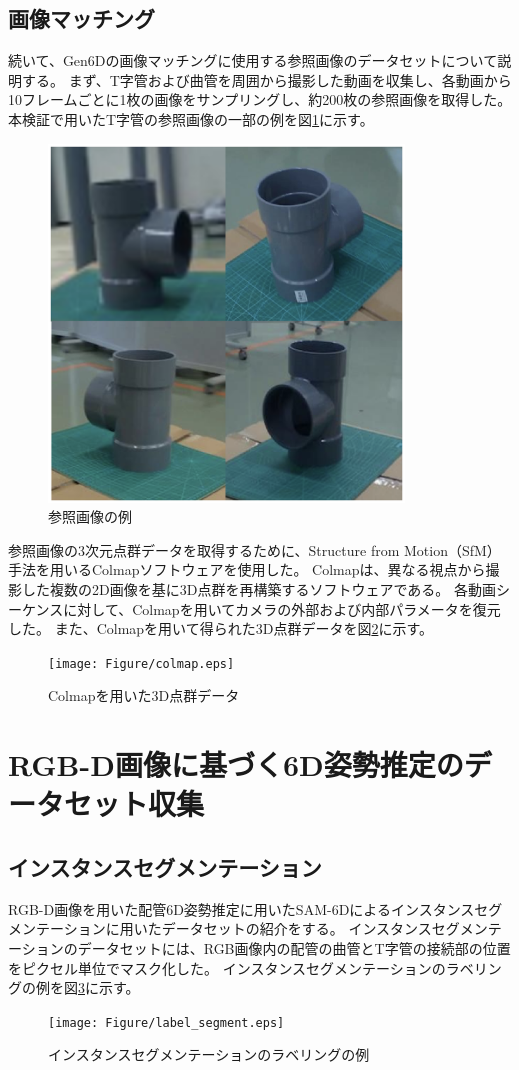 \subsection{画像マッチング}
続いて、Gen6Dの画像マッチングに使用する参照画像のデータセットについて説明する。
まず、T字管および曲管を周囲から撮影した動画を収集し、各動画から10フレームごとに1枚の画像をサンプリングし、約200枚の参照画像を取得した。
本検証で用いたT字管の参照画像の一部の例を図\ref{fig:f2}に示す。
\begin{figure}[htbt]
  \centering
   \includegraphics[height=95mm]{Figure/ref_images.eps}
   \caption{参照画像の例}
   \label{fig:f2}
\end{figure}

参照画像の3次元点群データを取得するために、Structure from Motion（SfM）手法を用いるColmapソフトウェアを使用した。
Colmapは、異なる視点から撮影した複数の2D画像を基に3D点群を再構築するソフトウェアである。
各動画シーケンスに対して、Colmapを用いてカメラの外部および内部パラメータを復元した。
また、Colmapを用いて得られた3D点群データを図\ref{fig:f3}に示す。
\begin{figure}[htbt]
  \centering
   \texttt{[image: Figure/colmap.eps]}
   \caption{Colmapを用いた3D点群データ}
   \label{fig:f3}
\end{figure}


\section{RGB-D画像に基づく6D姿勢推定のデータセット収集}
\subsection{インスタンスセグメンテーション}
RGB-D画像を用いた配管6D姿勢推定に用いたSAM-6Dによるインスタンスセグメンテーションに用いたデータセットの紹介をする。
インスタンスセグメンテーションのデータセットには、RGB画像内の配管の曲管とT字管の接続部の位置をピクセル単位でマスク化した。
インスタンスセグメンテーションのラベリングの例を図\ref{fig:f4}に示す。
\begin{figure}[htbt]
	\centering
	 \texttt{[image: Figure/label\_segment.eps]}
	 \caption{インスタンスセグメンテーションのラベリングの例}
	 \label{fig:f4}
\end{figure}

